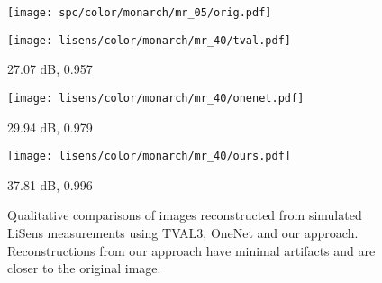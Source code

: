 \documentclass[journal,twoside]{IEEEtran}
\begin{document}
\begin{figure*}[t]
\begin{minipage}{.98\textwidth}
\begin{minipage}{.20\textwidth}
\vspace{-0.35cm}
\texttt{[image: spc/color/monarch/mr\_05/orig.pdf]}  
\end{minipage}\hspace{0.1cm}
\begin{minipage}{.20\textwidth}
\vspace{0.1cm}
\texttt{[image: lisens/color/monarch/mr\_40/tval.pdf]}  
\centerline{ 27.07 dB, 0.957}
\end{minipage}\hspace{0.1cm}
\begin{minipage}{.20\textwidth}
\vspace{0.1cm}
\texttt{[image: lisens/color/monarch/mr\_40/onenet.pdf]}  
\centerline{ 29.94 dB, 0.979}
\end{minipage}\hspace{0.1cm}
\begin{minipage}{.20\textwidth}
\vspace{0.1cm}
\texttt{[image: lisens/color/monarch/mr\_40/ours.pdf]}  
\centerline{ 37.81 dB, 0.996}
\end{minipage}
\end{minipage}
\caption{ Qualitative comparisons of images reconstructed from simulated LiSens measurements using TVAL3, OneNet and our approach. Reconstructions from our approach have minimal artifacts and are closer to the original image. }
\label{fig:lisens_color}
\end{figure*}

\ifCLASSOPTIONcaptionsoff
  \newpage
\fi











\begin{comment}

\begin{IEEEbiography}{Michael Shell}
Biography text here.
\end{IEEEbiography}

\begin{IEEEbiographynophoto}{John Doe}
Biography text here.
\end{IEEEbiographynophoto}


\begin{IEEEbiographynophoto}{Jane Doe}
Biography text here.
\end{IEEEbiographynophoto}
\end{comment}
\end{document}
